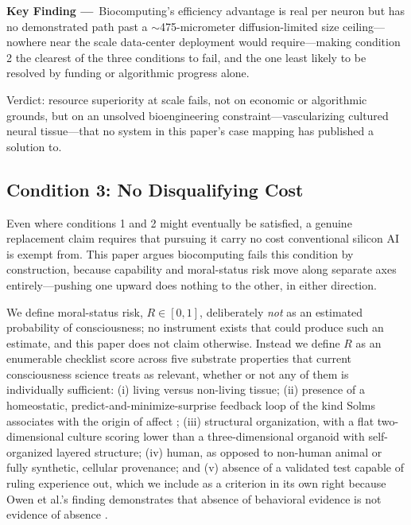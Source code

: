 \documentclass[journal]{IEEEtran}
\begin{document}
\begin{mdframed}[
  linecolor=ambercolor, linewidth=1.4pt,
  backgroundcolor=ambercolor!5,
  innerleftmargin=8pt, innerrightmargin=8pt,
  innertopmargin=6pt, innerbottommargin=6pt,
  roundcorner=4pt
]
\noindent\textbf{\textcolor{ambercolor}{Key Finding ---}}~Biocomputing's efficiency
advantage is real per neuron but has no demonstrated path past a $\sim$475-micrometer
diffusion-limited size ceiling---nowhere near the scale data-center deployment would
require---making condition 2 the clearest of the three conditions to fail, and the
one least likely to be resolved by funding or algorithmic progress alone.
\end{mdframed}

Verdict: resource superiority at scale fails, not on economic or algorithmic
grounds, but on an unsolved bioengineering constraint---vascularizing cultured
neural tissue---that no system in this paper's case mapping has published a
solution to.

\subsection{\textcolor{deepred}{Condition 3: No Disqualifying Cost}}

Even where conditions 1 and 2 might eventually be satisfied, a genuine replacement
claim requires that pursuing it carry no cost conventional silicon AI is exempt
from. This paper argues biocomputing fails this condition by construction, because
capability and moral-status risk move along separate axes entirely---pushing one
upward does nothing to the other, in either direction.

We define moral-status risk, $R \in [0,1]$, deliberately \emph{not} as an estimated
probability of consciousness; no instrument exists that could produce such an
estimate, and this paper does not claim otherwise. Instead we define $R$ as an
enumerable checklist score across five substrate properties that current
consciousness science treats as relevant, whether or not any of them is individually
sufficient: (i) living versus non-living tissue; (ii) presence of a homeostatic,
predict-and-minimize-surprise feedback loop of the kind Solms associates with the
origin of affect \cite{solms2019hard}; (iii) structural organization, with a flat
two-dimensional culture scoring lower than a three-dimensional organoid with
self-organized layered structure; (iv) human, as opposed to non-human animal or
fully synthetic, cellular provenance; and (v) absence of a validated test capable of
ruling experience out, which we include as a criterion in its own right because
Owen et al.'s finding demonstrates that absence of behavioral evidence is not
evidence of absence \cite{owen2006detecting}.
\end{document}
